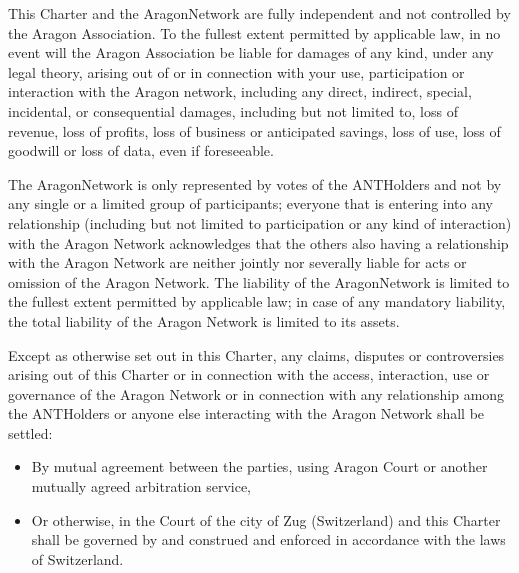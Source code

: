 \begin{enumerate}
	This Charter and the \gls{AragonNetwork} are fully independent and not controlled by the Aragon Association. To the fullest extent permitted by applicable law, in no event will the Aragon Association be liable for damages of any kind, under any legal theory, arising out of or in connection with your use, participation or interaction with the Aragon network, including any direct, indirect, special, incidental, or consequential damages, including but not limited to, loss of revenue, loss of profits, loss of business or anticipated savings, loss of use, loss of goodwill or loss of data, even if foreseeable.
	
	The \gls{AragonNetwork} is only represented by votes of the \glspl{ANTHolder} and not by any single or a limited group of participants; 
	everyone that is entering into any relationship (including but not limited to participation or any kind of interaction) with the Aragon Network acknowledges that the others also having a relationship with the Aragon Network are neither jointly nor severally liable for acts or omission of the Aragon Network. 
	The liability of the \gls{AragonNetwork} is limited to the fullest extent permitted by applicable law; in case of any mandatory liability, the total liability of the Aragon Network is limited to its assets.
	
	Except as otherwise set out in this Charter, any claims, disputes or controversies arising out of this Charter or in connection with the access, interaction, use or governance of the Aragon Network or in connection with any relationship among the \glspl{ANTHolder} or anyone else interacting with the Aragon Network shall be settled:
	\begin{itemize}
		\item By mutual agreement between the parties, using Aragon Court or another mutually agreed arbitration service,
		\item Or otherwise, in the Court of the city of Zug (Switzerland) and this Charter shall be governed by and construed and enforced in accordance with the laws of Switzerland.
	\end{itemize}
\end{enumerate}

